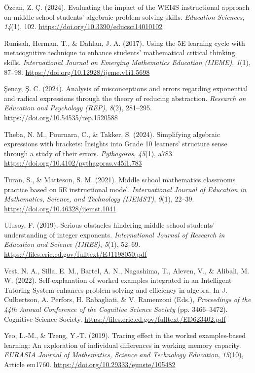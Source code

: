 \documentclass[a4paper,12pt]{article}
\begin{document}
{Özcan, Z. Ç. (2024). Evaluating the impact of the WEI4S instructional approach on middle school students' algebraic problem-solving skills. \textit{Education Sciences}, \textit{14}(1), 102. \url{https://doi.org/10.3390/educsci14010102}

Runisah, Herman, T., \& Dahlan, J. A. (2017). Using the 5E learning cycle with metacognitive technique to enhance students' mathematical critical thinking skills. \textit{International Journal on Emerging Mathematics Education (IJEME)}, \textit{1}(1), 87--98. \url{https://doi.org/10.12928/ijeme.v1i1.5698}

Şenay, Ş. C. (2024). Analysis of misconceptions and errors regarding exponential and radical expressions through the theory of reducing abstraction. \textit{Research on Education and Psychology (REP)}, \textit{8}(2), 281--295. \url{https://doi.org/10.54535/rep.1520588}

Theba, N. M., Pournara, C., \& Takker, S. (2024). Simplifying algebraic expressions with brackets: Insights into Grade 10 learners' structure sense through a study of their errors. \textit{Pythagoras}, \textit{45}(1), a783. \url{https://doi.org/10.4102/pythagoras.v45i1.783}

Turan, S., \& Matteson, S. M. (2021). Middle school mathematics classrooms practice based on 5E instructional model. \textit{International Journal of Education in Mathematics, Science, and Technology (IJEMST)}, \textit{9}(1), 22--39. \url{https://doi.org/10.46328/ijemst.1041}

Ulusoy, F. (2019). Serious obstacles hindering middle school students' understanding of integer exponents. \textit{International Journal of Research in Education and Science (IJRES)}, \textit{5}(1), 52--69. \url{https://files.eric.ed.gov/fulltext/EJ1198050.pdf}

Vest, N. A., Silla, E. M., Bartel, A. N., Nagashima, T., Aleven, V., \& Alibali, M. W. (2022). Self-explanation of worked examples integrated in an Intelligent Tutoring System enhances problem solving and efficiency in algebra. In J. Culbertson, A. Perfors, H. Rabagliati, \& V. Ramenzoni (Eds.), \textit{Proceedings of the 44th Annual Conference of the Cognitive Science Society} (pp. 3466--3472). Cognitive Science Society. \url{https://files.eric.ed.gov/fulltext/ED623402.pdf}

Yeo, L.-M., \& Tzeng, Y.-T. (2019). Tracing effect in the worked examples-based learning: An exploration of individual differences in working memory capacity. \textit{EURASIA Journal of Mathematics, Science and Technology Education}, \textit{15}(10), Article em1760. \url{https://doi.org/10.29333/ejmste/105482}
\par}
\end{document}
